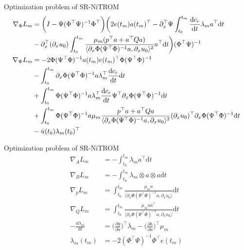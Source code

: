 \documentclass[presentation]{beamer}
\begin{document}
\begin{frame}[label={sec:orgc3b12b8}]{Optimization problem of SR-NiTROM}
\begin{subequations}
\begin{align}
\nabla_{\Phi}L_{m} &= \bigg(I - \Psi(\Phi^{\top}\Psi)^{-1}\Phi^{\top}\bigg)\bigg(2e(t_{m})a(t_{m})^{\top} - \partial_{x}^{\top}\Psi\int_{t_{0}}^{t_{m}}\frac{\mathrm{d}c_{r}}{\mathrm{d}t}\lambda_{m}a^{\top}\mathrm{d}t\notag\\
               &- \partial_{x}^{\top}(\partial_{x}u_{0})\int_{t_{0}}^{t_{m}}\frac{\mu_{m}(p^{\top}a + a^{\top}Qa)}{\langle\partial_{x}\Phi(\Psi^{\top}\Phi)^{-1}a, \partial_{x}u_{0}\rangle^{2}}a^{\top}\mathrm{d}t\bigg)(\Phi^{\top}\Psi)^{-1}\\
\nabla_{\Psi}L_{m} &= -2\Phi(\Psi^{\top}\Phi)^{-1}a(t_{m})e(t_{m})^{\top}\Phi(\Psi^{\top}\Phi)^{-1}\notag\\
               &- \int_{t_{0}}^{t_{m}}\partial_{x}\Phi(\Psi^{\top}\Phi)^{-1}a\lambda_{m}^{\top}\frac{\mathrm{d}c_{r}}{\mathrm{d}t}\mathrm{d}t\notag\\
               &+ \int_{t_{0}}^{t_{m}}\Phi(\Psi^{\top}\Phi)^{-1}a\lambda_{m}^{\top}\frac{\mathrm{d}c_{r}}{\mathrm{d}t}\Psi^{\top}\partial_{x}\Phi(\Psi^{\top}\Phi)^{-1}\mathrm{d}t\notag\\
               &+ \int_{t_{0}}^{t_{m}}\Phi(\Psi^{\top}\Phi)^{-1}a\mu_{m}\frac{p^{\top}a + a^{\top}Qa}{\langle\partial_{x}\Phi(\Psi^{\top}\Phi)^{-1}a, \partial_{x}u_{0}\rangle^{2}}(\partial_{x}u_{0})^{\top}\partial_{x}\Phi(\Psi^{\top}\Phi)^{-1}\mathrm{d}t\notag\\
               &- \hat{u}(t_{0})\lambda_{m}(t_{0})^{\top}        
\end{align}
\end{subequations}
\end{frame}

\begin{frame}[label={sec:org2aeb06d}]{Optimization problem of SR-NiTROM}
\begin{subequations}
\begin{align}
\nabla_{A}L_{m} &= -\int_{t_{0}}^{t_{m}}\lambda_{m}a^{\top}\mathrm{d}t\\
\nabla_{B}L_{m} &= -\int_{t_{0}}^{t_{m}}\lambda_{m}\otimes a\otimes a\mathrm{d}t\\
\nabla_{p}L_{m} &= \int_{t_{0}}^{t_{m}}\frac{\mu_{m}a}{\langle\partial_{x}\Phi(\Psi^{\top}\Phi)^{-1}a, \partial_{x}u_{0}\rangle}\mathrm{d}t\\
\nabla_{Q}L_{m} &= \int_{t_{0}}^{t_{m}}\frac{\mu_{m}aa^{\top}}{\langle\partial_{x}\Phi(\Psi^{\top}\Phi)^{-1}a, \partial_{x}u_{0}\rangle}\mathrm{d}t\\       
-\frac{\mathrm{d}\lambda_{m}}{\mathrm{d}t} &= \bigg(\frac{\partial g}{\partial a}\bigg)^{\top}\lambda_{m} - \bigg(\frac{\partial h}{\partial a}\bigg)^{\top}\mu_{m}\\
\lambda_{m}(t_{m}) &= -2(\Phi^{\top}\Psi)^{-1}\Phi^{\top}e(t_{m})
\end{align}
\end{subequations}
\end{frame}
\end{document}

